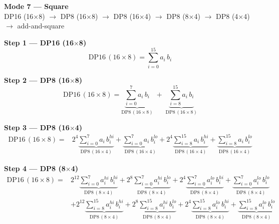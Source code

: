 \documentclass[fleqn]{article}
\newcommand{\DPop}[3]{\mathrm{DP#1}\,(#2\!\times\!#3)}
\begin{document}
\begin{center}
{\LARGE \textbf{Mode 7 --- Square}}\\[4pt]
{\large DP16 (16$\times$8) $\rightarrow$ DP8 (16$\times$8) $\rightarrow$ DP8 (16$\times$4) $\rightarrow$ DP8 (8$\times$4) $\rightarrow$ DP8 (4$\times$4) $\rightarrow$ add-and-square}
\end{center}

\vspace{0.1em}

\textbf{Step 1 --- DP16 (16$\times$8)}
\[
\DPop{16}{16}{8} = \sum_{i=0}^{15} a_i \, b_i
\]

\textbf{Step 2 --- DP8 (16$\times$8)}
\[
\DPop{16}{16}{8}
  = \underbrace{\sum_{i=0}^{7} a_i \, b_i}_{\DPop{8}{16}{8}}
  \; + \; \underbrace{\sum_{i=8}^{15} a_i \, b_i}_{\DPop{8}{16}{8}}
\]

\textbf{Step 3 --- DP8 (16$\times$4)}
\begin{align*}
\DPop{16}{16}{8} = {}
  & 2^{4}\underbrace{\sum_{i=0}^{7} a_i \, b_i^{hi}}_{\DPop{8}{16}{4}}
  + \underbrace{\sum_{i=0}^{7} a_i \, b_i^{lo}}_{\DPop{8}{16}{4}}
  + 2^{4}\underbrace{\sum_{i=8}^{15} a_i \, b_i^{hi}}_{\DPop{8}{16}{4}}
  + \underbrace{\sum_{i=8}^{15} a_i \, b_i^{lo}}_{\DPop{8}{16}{4}}
\end{align*}

\textbf{Step 4 --- DP8 (8$\times$4)}
\begin{align*}
\DPop{16}{16}{8} = {}
  & 2^{12}\underbrace{\sum_{i=0}^{7} a_i^{hi} \, b_i^{hi}}_{\DPop{8}{8}{4}}
  + 2^{8}\underbrace{\sum_{i=0}^{7} a_i^{hi} \, b_i^{lo}}_{\DPop{8}{8}{4}}
  + 2^{4}\underbrace{\sum_{i=0}^{7} a_i^{lo} \, b_i^{hi}}_{\DPop{8}{8}{4}}
  + \underbrace{\sum_{i=0}^{7} a_i^{lo} \, b_i^{lo}}_{\DPop{8}{8}{4}} \\[0.6em]
  & + 2^{12}\underbrace{\sum_{i=8}^{15} a_i^{hi} \, b_i^{hi}}_{\DPop{8}{8}{4}}
  + 2^{8}\underbrace{\sum_{i=8}^{15} a_i^{hi} \, b_i^{lo}}_{\DPop{8}{8}{4}}
  + 2^{4}\underbrace{\sum_{i=8}^{15} a_i^{lo} \, b_i^{hi}}_{\DPop{8}{8}{4}}
  + \underbrace{\sum_{i=8}^{15} a_i^{lo} \, b_i^{lo}}_{\DPop{8}{8}{4}}
\end{align*}
\end{document}
